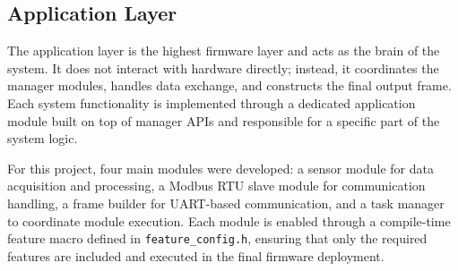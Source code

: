 \subsection{Application Layer}

The application layer is the highest firmware layer and acts as the brain of the system. It does not interact with hardware directly; instead, it coordinates the manager modules, handles data exchange, and constructs the final output frame. Each system functionality is implemented through a dedicated application module built on top of manager APIs and responsible for a specific part of the system logic.

For this project, four main modules were developed: a sensor module for data acquisition and processing, a Modbus RTU slave module for communication handling, a frame builder for UART-based communication, and a task manager to coordinate module execution. Each module is enabled through a compile-time feature macro defined in \texttt{feature\_config.h}, ensuring that only the required features are included and executed in the final firmware deployment.

